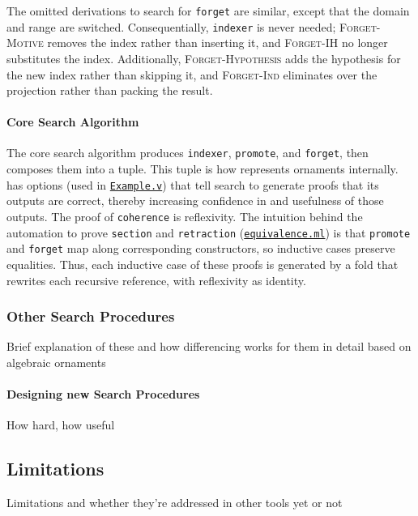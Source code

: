 The omitted derivations to search for \lstinline{forget} are similar,
except that the domain and range are switched. Consequentially, \lstinline{indexer} is never needed;
\textsc{Forget-Motive} removes the index rather than inserting it, and \textsc{Forget-IH} no longer substitutes the index.
Additionally, \textsc{Forget-Hypothesis} adds the hypothesis for the new index
rather than skipping it, and \textsc{Forget-Ind} eliminates over the projection rather than packing the result. %

\paragraph{Core Search Algorithm} The core search algorithm produces \lstinline{indexer},
\lstinline{promote}, and \lstinline{forget}, then composes them into a tuple. This tuple is how \toolnameb represents ornaments internally.
\toolnameb has options (used in \href{http://github.com/uwplse/ornamental-search/blob/itp+equiv/plugin/coq/examples/Example.v}{\lstinline{Example.v}}) that tell search to generate proofs that its outputs are correct, thereby increasing confidence in and
usefulness of those outputs.
The proof of \lstinline{coherence} is reflexivity.
The intuition behind 
the automation to prove \lstinline{section} and \lstinline{retraction} (\href{http://github.com/uwplse/ornamental-search/blob/itp+equiv/plugin/src/automation/equivalence.ml}{\lstinline{equivalence.ml}}) 
is that
\lstinline{promote} and \lstinline{forget} map along corresponding constructors, so inductive cases preserve equalities.
Thus, each inductive case of these proofs is generated by a fold that rewrites each recursive reference,
with reflexivity as identity.

\subsubsection{Other Search Procedures}

Brief explanation of these and how differencing works for them in detail based on algebraic ornaments


\paragraph{Designing new Search Procedures}
How hard, how useful

\subsection{Limitations}

Limitations and whether they're addressed in other tools yet or not
